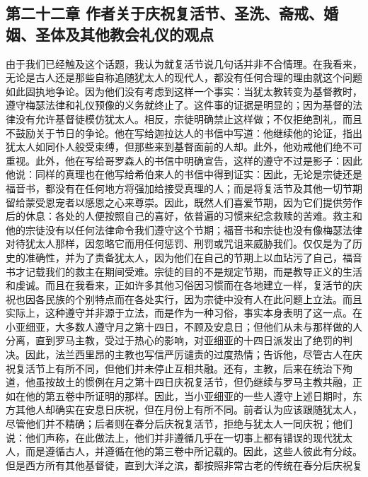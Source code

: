 
\subsection{第二十二章 作者关于庆祝复活节、圣洗、斋戒、婚姻、圣体及其他教会礼仪的观点}

由于我们已经触及这个话题，我认为就复活节说几句话并非不合情理。在我看来，无论是古人还是那些自称追随犹太人的现代人，都没有任何合理的理由就这个问题如此固执地争论。因为他们没有考虑到这样一个事实：当犹太教转变为基督教时，遵守梅瑟法律和礼仪预像的义务就终止了。这件事的证据是明显的；因为基督的法律没有允许基督徒模仿犹太人。相反，宗徒明确禁止这样做；不仅拒绝割礼，而且不鼓励关于节日的争论。他在写给迦拉达人的书信中写道：他继续他的论证，指出犹太人如同仆人般受束缚，但那些来到基督面前的人却。此外，他劝戒他们绝不可重视。此外，他在写给哥罗森人的书信中明确宣告，这样的遵守不过是影子：因此他说：同样的真理也在他写给希伯来人的书信中得到证实：因此，无论是宗徒还是福音书，都没有在任何地方将强加给接受真理的人；而是将复活节及其他一切节期留给蒙受恩宠者以感恩之心来尊崇。因此，既然人们喜爱节期，因为它们提供劳作后的休息：各处的人便按照自己的喜好，依普遍的习惯来纪念救赎的苦难。救主和他的宗徒没有以任何法律命令我们遵守这个节期；福音书和宗徒也没有像梅瑟法律对待犹太人那样，因忽略它而用任何惩罚、刑罚或咒诅来威胁我们。仅仅是为了历史的准确性，并为了责备犹太人，因为他们在自己的节期上以血玷污了自己，福音书才记载我们的救主在期间受难。宗徒的目的不是规定节期，而是教导正义的生活和虔诚。而且在我看来，正如许多其他习俗因习惯而在各地建立一样，复活节的庆祝也因各民族的个别特点而在各处实行，因为宗徒中没有人在此问题上立法。而且实际上，这种遵守并非源于立法，而是作为一种习俗，事实本身表明了这一点。在小亚细亚，大多数人遵守月之第十四日，不顾及安息日；但他们从未与那样做的人分离，直到罗马主教，受过于热心的影响，对亚细亚的十四日派发出了绝罚的判决。因此，法兰西里昂的主教也写信严厉谴责的过度热情；告诉他，尽管古人在庆祝复活节上有所不同，但他们并未停止互相共融。还有，主教，后来在统治下殉道，他虽按故土的惯例在月之第十四日庆祝复活节，但仍继续与罗马主教共融，正如在他的第五卷中所证明的那样。因此，当小亚细亚的一些人遵守上述日期时，东方其他人却确实在安息日庆祝，但在月份上有所不同。前者认为应该跟随犹太人，尽管他们并不精确；后者则在春分后庆祝复活节，拒绝与犹太人一同庆祝；他们说：他们声称，在此做法上，他们并非遵循几乎在一切事上都有错误的现代犹太人，而是遵循古人，并遵循在他的第三卷中所记载的。因此，这些人彼此有分歧。但是西方所有其他基督徒，直到大洋之滨，都按照非常古老的传统在春分后庆祝复